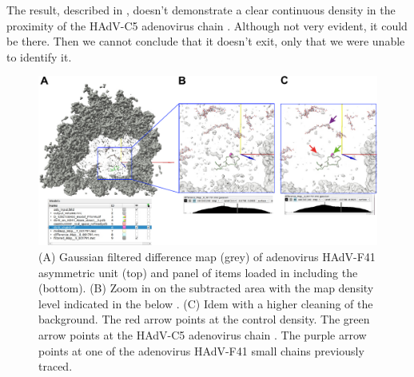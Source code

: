 \begin{itemize}
                        
                        The result, described in , doesn't demonstrate a clear continuous density in the proximity of the HAdV-C5 adenovirus chain . Although not very evident, it could be there. Then we cannot conclude that it doesn't exit, only that we were unable to identify it.
                            
                            \begin{figure}[H]
                            \centering 
                            \captionsetup{width=.9\linewidth} 
                            \includegraphics[width=.9\textwidth]{Images_appendix/Fig315.pdf}
                            \caption{(A) Gaussian filtered difference map (grey) of adenovirus HAdV-F41 asymmetric unit (top) and  panel of items loaded in \chimera including the   (bottom). (B) Zoom in on the subtracted area with the map density level indicated in the  below . (C) Idem with a higher cleaning of the background. The red arrow points at the control density. The green arrow points at the HAdV-C5 adenovirus chain . The purple arrow points at one of the adenovirus HAdV-F41 small chains previously traced.}  
                            \label{fig:app_usecase_mapsubtract_6}
                            \end{figure}
                
\end{itemize}
